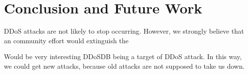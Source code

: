 \section{Conclusion and Future Work}

DDoS attacks are not likely to stop occurring. However, we strongly believe that an community effort would extinguish the 

Would be very interesting DDoSDB being a target of DDoS attack. In this way, we could get new attacks, because old attacks are not supposed to take us down.